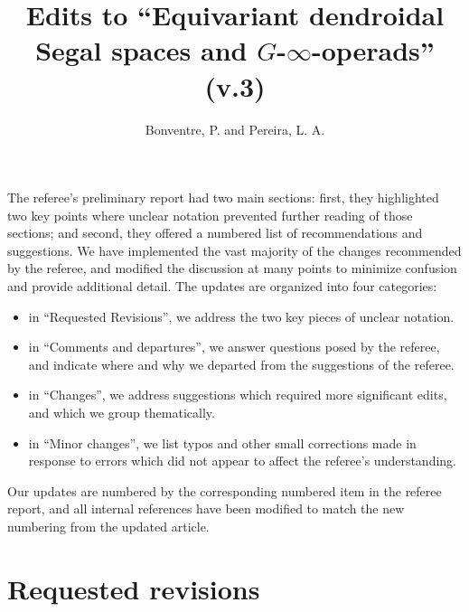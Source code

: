 \documentclass{article}
\begin{document}
 
 
\title{Edits to ``Equivariant dendroidal Segal spaces and $G$-$\infty$-operads'' (v.3)
\\[12pt]} %
 
\author{Bonventre, P. and Pereira, L. A.}
 
\maketitle
 
The referee's preliminary report had two main sections:
first, they highlighted two key points where unclear notation prevented further reading of those sections; %
and second, they offered a numbered list of recommendations and suggestions.
We have implemented the vast majority of the changes recommended by the referee, and modified the discussion at many points to minimize confusion and provide additional detail.
The updates are organized into four categories:
\begin{itemize}
\item in ``Requested Revisions'', we address the two key pieces of unclear notation.
\item in ``Comments and departures'', we answer questions posed by the referee, and indicate where and why we departed from the suggestions of the referee.
\item in ``Changes'', we address suggestions which required more significant edits,
and which we group thematically.
\item in ``Minor changes'', we list typos and other small corrections made in response to errors which did not appear to affect the referee's understanding.
\end{itemize}

Our updates are numbered by the corresponding numbered item in the referee report,
and all internal references have been modified to match the new numbering from the updated article.



\section{Requested revisions}

\end{document}
